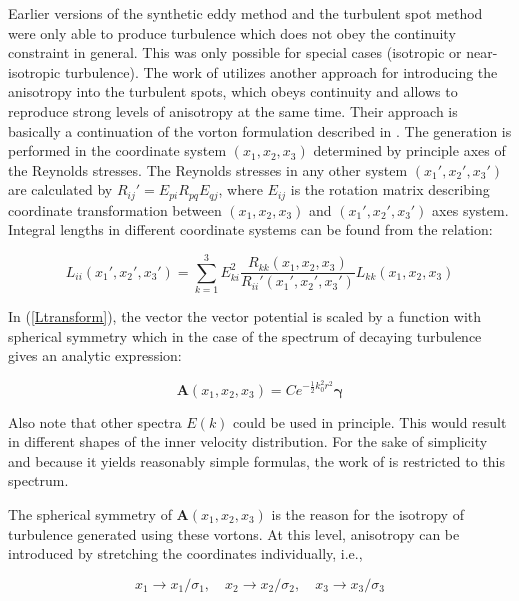 Earlier versions of the synthetic eddy method and the turbulent spot method were only able to produce turbulence which does not obey the continuity constraint in general. This was only possible for special cases (isotropic or near-isotropic turbulence). The work of \cite{kroger2018} utilizes another approach for introducing the anisotropy into the turbulent spots, which obeys continuity and allows to reproduce strong levels of anisotropy at the same time. Their approach is basically a continuation of the vorton formulation described in \cite{kornev2007}. The generation is performed in the coordinate system $(x_1,x_2,x_3)$ determined by principle axes of the Reynolds stresses. The Reynolds stresses in any other system $(x_1',x_2',x_3')$ are calculated by $R_{ij}' = E_{pi}R_{pq}E_{qj}$, where $E_{ij}$ is the rotation matrix describing coordinate transformation between $(x_1,x_2,x_3)$ and $(x_1',x_2',x_3')$ axes system. Integral lengths in different coordinate systems can be found from the relation:

\begin{equation}\label{Ltransform}
L_{ii}(x_1',x_2',x_3') = \sum_{k=1}^3E_{ki}^2\frac{R_{kk}(x_1,x_2,x_3)}{R_{ii}'(x_1',x_2',x_3')}L_{kk}(x_1,x_2,x_3)
\end{equation}

\noindent In (\ref{Ltransform}), the vector the vector potential is scaled by a function with spherical symmetry which in the case of the spectrum of decaying turbulence gives an analytic expression:

\begin{equation}
\boldsymbol{A}(x_1,x_2,x_3) = Ce^{-\frac{1}{2}k_0^2r^2}\boldsymbol{\gamma}
\end{equation}

\noindent Also note that other spectra $E(k)$ could be used in principle. This would result in different shapes of the inner velocity distribution. For the sake of simplicity and because it yields reasonably simple formulas, the work of \cite{kroger2018} is restricted to this spectrum. 

The spherical symmetry of $\boldsymbol{A}(x_1,x_2,x_3)$ is the reason for the isotropy of turbulence generated using these vortons. At this level, anisotropy can be introduced by stretching the coordinates individually, i.e.,

\begin{equation}
	x_1\rightarrow x_1/\sigma_1,\quad x_2\rightarrow x_2/\sigma_2,\quad x_3\rightarrow x_3/\sigma_3
\end{equation}

